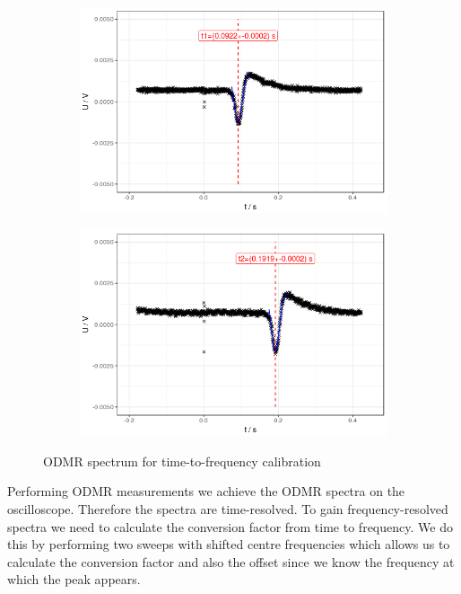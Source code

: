 \begin{figure}
	\begin{subfigure}{0.5\textwidth}
		\includegraphics[width=\textwidth]{../figures/odmr-cal-4.png}
	\end{subfigure}
	\begin{subfigure}{0.5\textwidth}
		\includegraphics[width=\textwidth]{../figures/odmr-cal-3.png}
	\end{subfigure}
	\caption{ODMR spectrum for time-to-frequency calibration}
	\label{fig:odmr-shift}
\end{figure}

Performing ODMR measurements we achieve the ODMR spectra on the oscilloscope. Therefore the spectra are time-resolved. To gain frequency-resolved spectra we need to calculate the conversion factor from time to frequency. We do this by performing two sweeps with shifted centre frequencies which allows us to calculate the conversion factor and also the offset since we know the frequency at which the peak appears.


